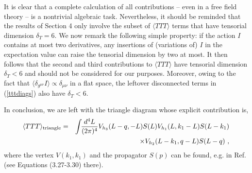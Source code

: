 \documentclass[11pt]{article}
\newcommand{\bea}{\begin{eqnarray}}
\newcommand{\eea}{\end{eqnarray}}
\def\nl{\nonumber\\}
\def\TTT{\bra TTT\ket}
\def\bra{\langle}
\def\ket{\rangle}
\def\dt{{\delta_T}} %
\begin{document}
It is clear that a complete calculation of all contributions 
-- even in a free field theory -- is a nontrivial algebraic task.
Nevertheless, it should be reminded that the results of Section
4 only involve the subset of $\TTT$ terms that have 
tensorial dimension $\dt=6$.
We now remark the following simple property: if 
the action $I$ contains at most two derivatives, any insertions of
(variations of) $I$ in the expectation value can raise the tensorial
dimension by two at most. It then follows that the
second and third contributions to $\TTT$ have tensorial dimension
$\dt <6$ and should not be considered for our purposes.
Moreover, owing to the fact that 
$\bra \delta_{g^{\mu \nu}} I\ket \propto \delta_{\mu \nu}$ in a flat space, 
the leftover disconnected terms in (\ref{tttdiags}) 
also have $\dt <6$.
 
In conclusion, we are left  with  the triangle diagram whose explicit
contribution is,  
\bea
\TTT_{{\rm triangle}}&=&
\int \!\!{d^4L\over (2 \pi)^4}
V_{h_3}(L-q,-L)S(L) V_{h_1}(L,k_1-L)S(L-k_1) \nl 
&&\qquad\qquad\times
V_{h_2}(L-k_1,q-L)S(L-q)\ ,
\eea
where the vertex $V(k_1,k_1)$ and the propagator $S(p)$
can be found, e.g.  in Ref.\cite{cfl}(see Equations (3.27-3.30) there).
\end{document}
